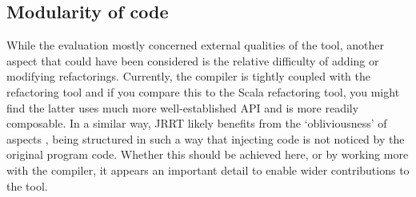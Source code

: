 
\subsection{Modularity of code}

While the evaluation mostly concerned external qualities of the tool, another aspect that could have been considered is the relative difficulty of adding or modifying refactorings. Currently, the compiler is tightly coupled with the refactoring tool and if you compare this to the Scala refactoring tool, you might find the latter uses much more well-established API and is more readily composable. In a similar way, JRRT likely benefits from the `obliviousness' of aspects \cite{aop}, being structured in such a way that injecting code is not noticed by the original program code. Whether this should be achieved here, or by working more with the compiler, it appears an important detail to enable wider contributions to the tool.
